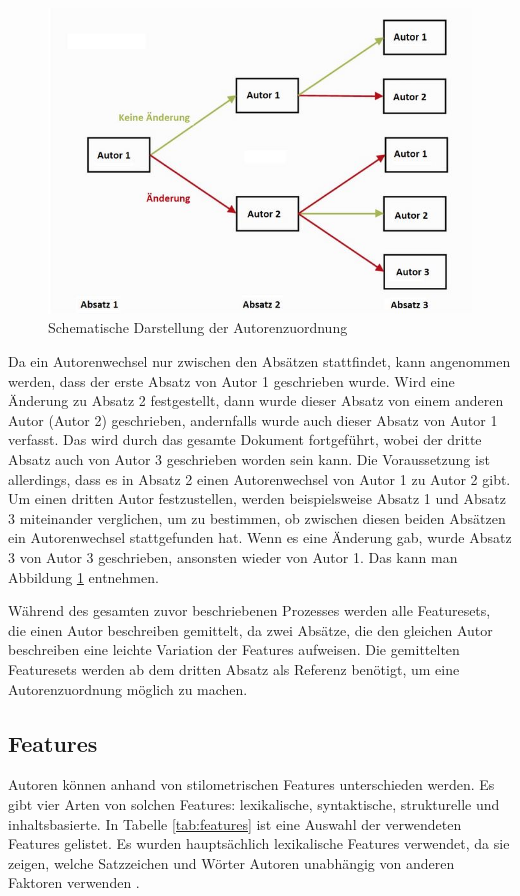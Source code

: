 \documentclass[conference]{IEEEtran}
\begin{document}
	\begin{figure}[h]
		\centering
		\includegraphics[width=0.7\linewidth]{Unbenannt}
		\caption{Schematische Darstellung der Autorenzuordnung}
		\label{fig:rfcalgorithm}
	\end{figure}
	
	
	Da ein Autorenwechsel nur zwischen den Absätzen stattfindet, kann angenommen werden, dass der erste Absatz von Autor 1 geschrieben wurde. Wird eine Änderung zu Absatz 2 festgestellt, dann wurde dieser Absatz von einem anderen Autor (Autor 2) geschrieben, andernfalls wurde auch dieser Absatz von Autor 1 verfasst. Das wird durch das gesamte Dokument fortgeführt, wobei der dritte Absatz auch von Autor 3  geschrieben worden sein kann. Die Voraussetzung ist allerdings, dass es in Absatz 2 einen Autorenwechsel von Autor 1 zu Autor 2 gibt. Um einen dritten Autor festzustellen, werden beispielsweise Absatz 1 und Absatz 3 miteinander verglichen, um zu bestimmen, ob zwischen diesen beiden Absätzen ein Autorenwechsel stattgefunden hat. Wenn es eine Änderung gab, wurde Absatz 3 von Autor 3 geschrieben, ansonsten wieder von Autor 1. Das kann man Abbildung \ref{fig:rfcalgorithm} entnehmen. 
	
	Während des gesamten zuvor beschriebenen Prozesses werden alle Featuresets, die einen Autor beschreiben gemittelt, da zwei Absätze, die den gleichen Autor beschreiben eine leichte Variation der Features aufweisen. Die gemittelten Featuresets werden ab dem dritten Absatz als Referenz benötigt, um eine Autorenzuordnung möglich zu machen.
	
\subsection{Features}
	Autoren können anhand von stilometrischen Features unterschieden werden. Es gibt vier Arten von solchen Features: lexikalische, syntaktische, strukturelle und inhaltsbasierte. In Tabelle \ref{tab:features} ist eine Auswahl der verwendeten Features gelistet. Es wurden hauptsächlich lexikalische Features verwendet, da sie zeigen, welche Satzzeichen und Wörter Autoren unabhängig von anderen Faktoren verwenden \cite{mf_b1}.
	 
\end{document}
